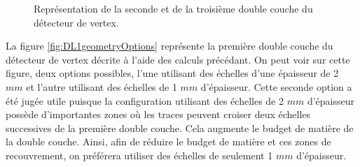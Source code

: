    \begin{figure}[htb!]
     \begin{center}
     \end{center}
     \caption{Repr\'esentation de la seconde et de la troisi\`eme double couche du d\'etecteur de vertex.}
     \label{fig:DL23geometryOptions}
   \end{figure}
   
   \medskip
   
   La figure \ref{fig:DL1geometryOptions} repr\'esente la premi\`ere double couche du d\'etecteur de vertex d\'ecrite \`a l'aide des calculs pr\'ec\'edant. On peut voir sur cette figure, deux options possibles, l'une utilisant des \'echelles d'une \'epaisseur de 2 $mm$ et l'autre utilisant des \'echelles de 1 $mm$ d'\'epaisseur. Cette seconde option a \'et\'e jug\'ee utile puisque la configuration utilisant des \'echelles de 2 $mm$ d'\'epaisseur poss\`ede d'importantes zones o\`u les traces peuvent croiser deux \'echelles successives de la premi\`ere double couche. Cela augmente le budget de mati\`ere de la double couche. Ainsi, afin de r\'eduire le budget de mati\`ere et ces zones de recouvrement, on pr\'ef\'erera utiliser des \'echelles de seulement 1 $mm$ d'\'epaisseur.
   
